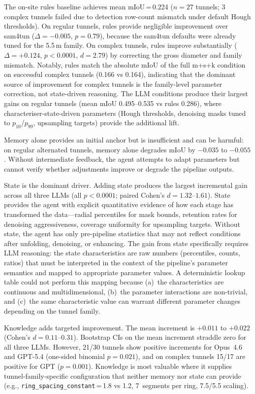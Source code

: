 \documentclass[a4paper,fleqn]{cas-dc}
\begin{document}
The on-site rules baseline achieves mean mIoU\,=\,0.224 ($n=27$ tunnels; 3 complex tunnels failed due to detection row-count mismatch under default Hough thresholds). On regular tunnels, rules provide negligible improvement over sam4tun ($\Delta = -0.005$, $p = 0.79$), because the sam4tun defaults were already tuned for the 5.5\,m family. On complex tunnels, rules improve substantially ($\Delta = +0.124$, $p < 0.0001$, $d = 2.79$) by correcting the gross diameter and family mismatch. Notably, rules match the absolute mIoU of the full m+s+k condition on successful complex tunnels (0.166 vs 0.164), indicating that the dominant source of improvement for complex tunnels is the family-level parameter correction, not state-driven reasoning. The LLM conditions produce their largest gains on regular tunnels (mean mIoU 0.495--0.535 vs rules 0.286), where characteriser-state-driven parameters (Hough thresholds, denoising masks tuned to $p_{10}$/$p_{99}$, upsampling targets) provide the additional lift.

Memory alone provides an initial anchor but is insufficient and can be harmful: on regular alternated tunnels, memory alone degrades mIoU by $-0.035$ to $-0.055$. Without intermediate feedback, the agent attempts to adapt parameters but cannot verify whether adjustments improve or degrade the pipeline outputs.

State is the dominant driver. Adding state produces the largest incremental gain across all three LLMs (all $p < 0.0001$; paired Cohen's $d = 1.32$--$1.61$). State provides the agent with explicit quantitative evidence of how each stage has transformed the data---radial percentiles for mask bounds, retention rates for denoising aggressiveness, coverage uniformity for upsampling targets. Without state, the agent has only pre-pipeline statistics that may not reflect conditions after unfolding, denoising, or enhancing. The gain from state specifically requires LLM reasoning: the state characteristics are raw numbers (percentiles, counts, ratios) that must be interpreted in the context of the pipeline's parameter semantics and mapped to appropriate parameter values. A deterministic lookup table could not perform this mapping because (a)~the characteristics are continuous and multidimensional, (b)~the parameter interactions are non-trivial, and (c)~the same characteristic value can warrant different parameter changes depending on the tunnel family.

Knowledge adds targeted improvement. The mean increment is $+0.011$ to $+0.022$ (Cohen's $d = 0.11$--$0.31$). Bootstrap CIs on the mean increment straddle zero for all three LLMs. However, 21/30 tunnels show positive increments for Opus~4.6 and GPT-5.4 (one-sided binomial $p = 0.021$), and on complex tunnels 15/17 are positive for GPT ($p = 0.001$). Knowledge is most valuable where it supplies tunnel-family-specific configuration that neither memory nor state can provide (e.g., \texttt{ring\_spacing\_constant}\,=\,1.8 vs 1.2, 7~segments per ring, 7.5/5.5 scaling).
\end{document}
